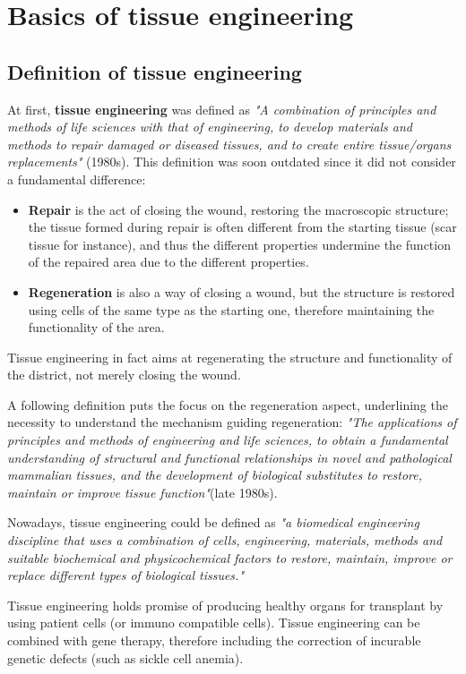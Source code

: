 \chapter{Basics of tissue engineering}

\section{Definition of tissue engineering}
  At first, \textbf{tissue engineering} was defined as \textit{"A combination of principles and methods of life sciences with that of engineering, to develop materials and methods to repair damaged or diseased tissues, and to create entire tissue/organs replacements"} (1980s). 
  This definition was soon outdated since it did not consider a fundamental difference:
  \begin{itemize}
    \item \textbf{Repair} is the act of closing the wound, restoring the macroscopic structure; the tissue  formed during repair is often different from the starting tissue (scar tissue for instance), and thus the different properties undermine the function of the repaired area due to the different properties.
    \item \textbf{Regeneration} is also a way of closing a wound, but the structure is restored using cells of the same type as the starting one, therefore maintaining the functionality of the area. 
  \end{itemize}
  Tissue engineering in fact aims at regenerating the structure and functionality of the district, not merely closing the wound.

  A following definition puts the focus on the regeneration aspect, underlining the necessity to understand the mechanism guiding regeneration: \textit{"The applications of principles and methods of engineering and life sciences, to obtain a fundamental understanding of structural and functional relationships in novel and pathological mammalian tissues, and the development of biological substitutes to restore, maintain or improve tissue function"}(late 1980s).

  Nowadays, tissue engineering could be defined as \textit{"a biomedical engineering discipline that uses a combination of cells, engineering, materials, methods and suitable biochemical and physicochemical factors to restore, maintain, improve or replace different types of biological tissues."}

  Tissue engineering holds promise of producing healthy organs for transplant by using patient cells (or immuno compatible cells). Tissue engineering can be combined with gene therapy, therefore including the correction of incurable genetic defects (such as sickle cell anemia).


